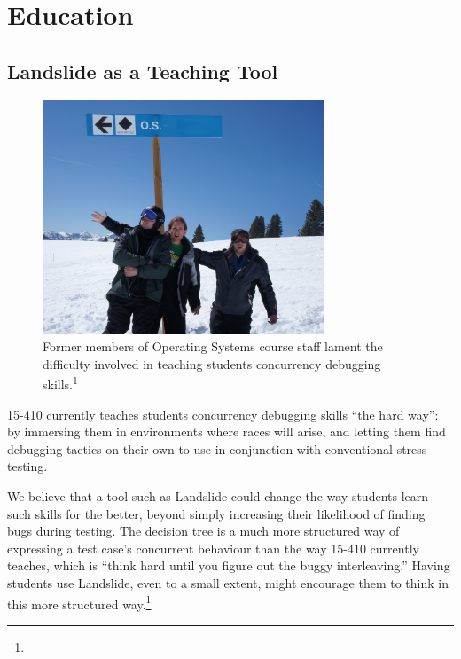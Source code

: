 \section{Education}
\label{sec:future-education}

\subsection{Landslide as a Teaching Tool}

\begin{figure}[h]
	\begin{center}
	\includegraphics[width=0.75\textwidth]{wont-modify-vail.jpg}
	\end{center}
	\caption{Former members of Operating Systems course staff lament the difficulty involved in teaching students concurrency debugging skills.\textsuperscript{1}}
\end{figure}

15-410 currently teaches students concurrency debugging skills ``the hard way'': by immersing them in environments where races will arise, and letting them find debugging tactics on their own to use in conjunction with conventional stress testing.

We believe that a tool such as Landslide could change the way students learn such skills for the better, beyond simply increasing their likelihood of finding bugs during testing. The decision tree is a much more structured way of expressing a test case's concurrent behaviour than the way 15-410 currently teaches, which is ``think hard until you figure out the buggy interleaving.'' Having students use Landslide, even to a small extent, might encourage them to think in this more structured way.\footnote{
}


